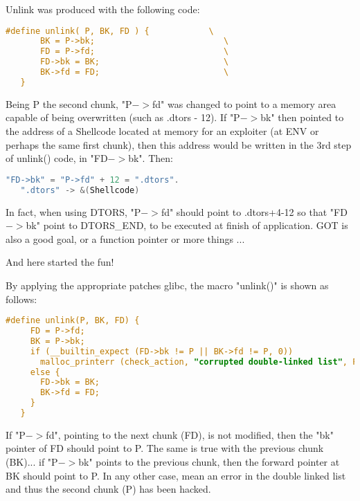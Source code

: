 \documentclass[12pt]{article}
\begin{document}
Unlink was produced with the following code:
\begin{lstlisting}[language=C]
   #define unlink( P, BK, FD ) {            \
       BK = P->bk;                          \
       FD = P->fd;                          \
       FD->bk = BK;                         \
       BK->fd = FD;                         \
   }
\end{lstlisting}

Being P the second chunk, "P$->$fd" was changed to point to a memory area
capable of being overwritten (such as .dtors - 12). If "P$->$bk" then
pointed to the address of a Shellcode located at memory for an exploiter
(at ENV or perhaps the same first chunk), then this address would be
written in the 3rd step of unlink() code, in "FD$->$bk". Then:
\newline

\begin{lstlisting}[language=C]
   "FD->bk" = "P->fd" + 12 = ".dtors".
   ".dtors" -> &(Shellcode)
\end{lstlisting}


In fact, when using DTORS, "P$->$fd" should point to .dtors+4-12 so that
"FD$->$bk" point to DTORS\_END, to be executed at finish of application. GOT
is also a good goal, or a function pointer or more things ...
\newline


And here started the fun!
\newline


By applying the appropriate patches glibc, the macro "unlink()" is shown
as follows:
\newline

\begin{lstlisting}[language=C]
   #define unlink(P, BK, FD) {                                            \
     FD = P->fd;                                                          \
     BK = P->bk;                                                          \
     if (__builtin_expect (FD->bk != P || BK->fd != P, 0))                \
       malloc_printerr (check_action, "corrupted double-linked list", P); \
     else {                                                               \
       FD->bk = BK;                                                       \
       BK->fd = FD;                                                       \
     }                                                                    \
   }
\end{lstlisting}


If "P$->$fd", pointing to the next chunk (FD), is not modified, then the
"bk" pointer of FD should point to P. The same is true with the previous
chunk (BK)... if "P$->$bk" points to the previous chunk, then the forward
pointer at BK should point to P. In any other case, mean an error in the
double linked list and thus the second chunk (P) has been hacked.
\newline
\end{document}
